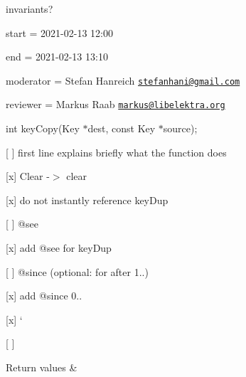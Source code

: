 invariants?


\begin{DoxyItemize}
\item start = 2021-\/02-\/13 12\+:00
\item end = 2021-\/02-\/13 13\+:10
\item moderator = Stefan Hanreich \href{mailto:stefanhani@gmail.com}{\tt stefanhani@gmail.\+com}
\item reviewer = Markus Raab \href{mailto:markus@libelektra.org}{\tt markus@libelektra.\+org}
\end{DoxyItemize}

{\ttfamily int key\+Copy(\+Key $\ast$dest, const Key $\ast$source);}


\begin{DoxyItemize}
\item \mbox{[} \mbox{]} first line explains briefly what the function does
\begin{DoxyItemize}
\item \mbox{[}x\mbox{]} Clear -\/$>$ clear
\item \mbox{[}x\mbox{]} do not instantly reference {\ttfamily key\+Dup}
\end{DoxyItemize}
\item \mbox{[} \mbox{]} {\ttfamily @see}
\begin{DoxyItemize}
\item \mbox{[}x\mbox{]} add {\ttfamily @see} for {\ttfamily key\+Dup}
\end{DoxyItemize}
\item \mbox{[} \mbox{]} {\ttfamily @since} (optional\+: for after 1..)
\begin{DoxyItemize}
\item \mbox{[}x\mbox{]} add {\ttfamily @since} 0..
\end{DoxyItemize}
\item \mbox{[}x\mbox{]} `{\ttfamily }
\item {\ttfamily \mbox{[} \mbox{]}}
\begin{DoxyRetVals}{Return values}
{\em } & \\
\hline
\end{DoxyRetVals}

\end{DoxyItemize}